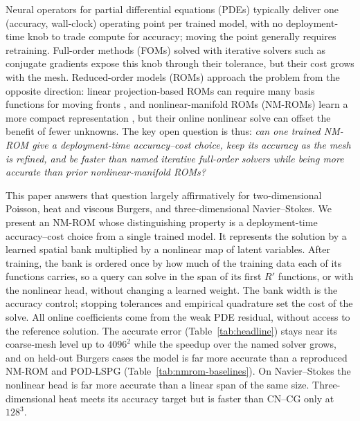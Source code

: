 \documentclass{article}
\begin{document}
Neural operators for partial differential equations (PDEs)
\citep{Li2020FNO,Lu2021DeepONet,Kovachki2023NeuralOperator} typically
deliver one (accuracy, wall-clock) operating point per trained model,
with no deployment-time knob to trade compute for accuracy; moving the
point generally requires retraining. Full-order methods (FOMs) solved
with iterative solvers such as conjugate gradients
\citep{HestenesStiefel1952CG} expose this knob through their tolerance,
but their cost grows with the mesh. Reduced-order models (ROMs) approach
the problem from the opposite direction: linear projection-based ROMs
\citep{BennerGugercinWillcox2015,Sirovich1987POD} can require many basis
functions for moving fronts \citep{CohenDeVore2015}, and
nonlinear-manifold ROMs (NM-ROMs) learn a more compact representation
\citep{LeeCarlberg2020,KimChoi2022NMROM}, but their online nonlinear
solve can offset the benefit of fewer unknowns. The key open question is thus:
\emph{can one trained NM-ROM give a deployment-time accuracy--cost
choice, keep its accuracy as the mesh is refined, and be faster than
named iterative full-order solvers while being more accurate than prior
nonlinear-manifold ROMs?}

This paper answers that question largely affirmatively for
two-dimensional Poisson, heat and viscous Burgers, and three-dimensional
Navier--Stokes. We present an NM-ROM whose distinguishing property is a
deployment-time accuracy--cost choice from a single trained model. It
represents the solution by a learned spatial bank multiplied by a
nonlinear map of latent variables. After training, the bank is ordered
once by how much of the training data each of its functions carries, so a
query can solve in the span of its first $R'$ functions, or with the
nonlinear head, without changing a learned weight. The bank width is the
accuracy control; stopping tolerances and empirical quadrature set the
cost of the solve. All
online coefficients come from the weak PDE residual, without access to
the reference solution. The accurate error
(Table~\ref{tab:headline})
stays near its coarse-mesh level up to $4096^2$ while the speedup over
the named solver grows, and on held-out Burgers cases the model is far
more accurate than a reproduced NM-ROM and POD-LSPG
(Table~\ref{tab:nmrom-baselines}). On Navier--Stokes the nonlinear head
is far more accurate than a linear span of the same size. Three-dimensional
heat meets its accuracy target but is faster than CN--CG only at
$128^3$.
\end{document}
